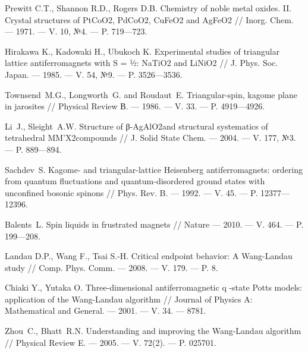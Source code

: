 \begin{thebibliography}{11}
Prewitt C.T., Shannon R.D., Rogers D.B.
Chemistry of noble metal oxides. II. Crystal structures of PtCoO2, PdCoO2, CuFeO2 and AgFeO2
//
Inorg. Chem.
--- 1971.
--- V. 10, №4.
--- P. 719---723.





Hirakawa K., Kadowaki H., Ubukoch K.
Experimental studies of triangular lattice antiferromagnets with S = ½: NaTiO2 and LiNiO2
//
J. Phys. Soc. Japan.
--- 1985.
--- V. 54, №9.
--- P. 3526---3536.





Townsend~M.G., Longworth~G. and Roudaut~E.
Triangular-spin, kagome plane in jarosites 
// 
Physical Review В.
--- 1986.
--- V. 33.
--- P. 4919---4926.





Li~J., Sleight~A.W. 
Structure of β-AgAlO2and structural systematics of tetrahedral MM'X2compounds 
// 
J. Solid State Chem. 
--- 2004. 
--- V. 177, №3.
--- P. 889---894.





Sachdev~S. 
Kagome- and triangular-lattice Heisenberg antiferromagnets: ordering from quantum fluctuations and quantum-disordered ground states with unconfined bosonic spinons 
//
Phys. Rev. B.
--- 1992.
--- V. 45.
--- P. 12377---12396.





Balents~L. 
Spin liquids in frustrated magnets
// 
Nature
--- 2010.
--- V. 464.
--- P. 199---208.





Landau D.P., Wang F., Tsai S.-H.
Critical endpoint behavior: A Wang-Landau study
//
Comp. Phys. Comm.
--- 2008.
--- V. 179.
--- P. 8.





Chiaki Y., Yutaka O.
Three-dimensional antiferromagnetic q -state Potts models: application of the Wang-Landau algorithm
//
Journal of Physics A: Mathematical and General.
--- 2001.
--- V. 34.
--- 8781.





Zhou~C., Bhatt~R.N. 
Understanding and improving the Wang-Landau algorithm 
//
Physical Review E.
--- 2005.
--- V. 72(2).
--- P. 025701.





\end{thebibliography}
